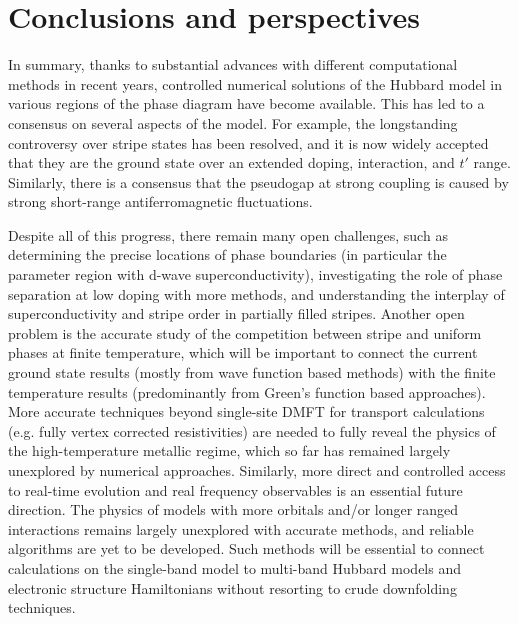 \documentclass{ar-1col}
\begin{document}
\section{Conclusions and perspectives}
\label{sec:conclusions}
In summary, thanks to substantial advances with different computational methods in recent years, controlled numerical solutions of the Hubbard model in various regions of the phase diagram have become available. This has led to a consensus on several aspects of the model. For example, the longstanding controversy over stripe states has been resolved, and it is now widely accepted that they are the ground state over an extended doping, interaction, and $t'$ range. Similarly, there is a consensus that the pseudogap at strong coupling is caused by strong short-range antiferromagnetic fluctuations.

Despite all of this progress, there  remain many open challenges, such as determining the precise locations of phase boundaries (in particular the parameter region with d-wave superconductivity), investigating the role of phase separation at low doping with more methods, and understanding the interplay of superconductivity and stripe order in partially filled stripes. 
Another open problem is the accurate study of the competition between stripe and uniform phases at finite temperature, which will be important to connect the current ground state results (mostly from wave function based methods) with the finite temperature results (predominantly from Green's function based approaches). 
More accurate techniques beyond single-site DMFT for transport calculations (e.g. fully vertex corrected resistivities) are needed to fully reveal the physics of the high-temperature metallic regime, which so far has remained largely unexplored by numerical approaches.
Similarly, more direct and controlled access to real-time evolution and real frequency observables is an essential future direction.
The physics of models with more orbitals and/or longer ranged interactions remains largely unexplored with accurate methods, and reliable algorithms are yet to be developed. Such methods will be essential to connect calculations on the single-band model to multi-band Hubbard models and electronic structure Hamiltonians without resorting to crude downfolding techniques.
\end{document}
